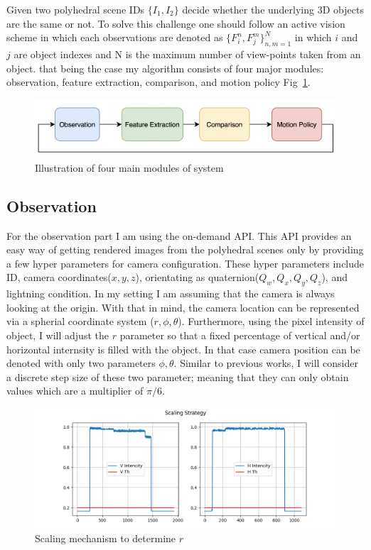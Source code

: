 \documentclass[crop=false]{standalone}
\begin{document}
Given two polyhedral scene IDs $\{I_1, I_2\}$ decide whether the underlying 3D objects are the same or not. To solve this challenge one should follow an active vision scheme in which each observations are denoted as $\{ F_i^n, F_j^m \}_{n, m = 1}^{N}$ in which $i$ and $j$ are object indexes and N is the maximum number of view-points taken from an object. that being the case my algorithm consists of four major modules: observation, feature extraction, comparison, and motion policy Fig~\ref{fig:chain}.


\begin{figure}[t]
\centering
\includegraphics[width=0.9\columnwidth]{figure/module.png}
\caption{Illustration of four main modules of system}
\label{fig:chain}
\end{figure}

\subsection{Observation \label{subsection:observation}}

\noindent For the observation part I am using the on-demand API. This API provides an easy way of getting rendered images from the polyhedral scenes only by providing a few hyper parameters for camera configuration. These hyper parameters include ID, camera coordinates($x, y, z$), orientating as quaternion($Q_w, Q_x, Q_y, Q_z$), and lightning condition. In my setting I am assuming that the camera is always looking at the origin. With that in mind, the camera location can be represented via a spherial coordinate system ($r, \phi, \theta$). Furthermore, using the pixel intensity of object, I will adjust the $r$ parameter so that a fixed percentage of vertical and/or horizontal internsity is filled with the object. In that case camera position can be denoted with only two parameters $\phi, \theta$. Similar to previous works, I will consider a discrete step size of these two parameter; meaning that they can only obtain values which are a multiplier of $\pi/6$.

\begin{figure}[t]
\centering{}\includegraphics[width=0.95\columnwidth]{figure/scaling.png}
\caption{\label{fig:scaling} Scaling mechanism to determine $r$}
\end{figure}
\end{document}
